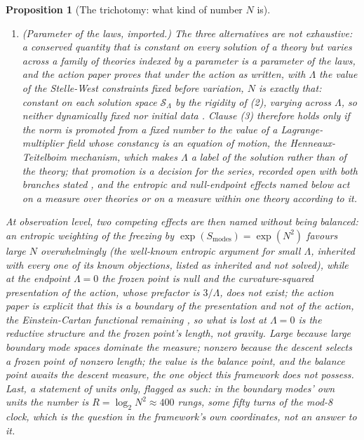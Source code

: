 \documentclass[11pt]{article}
\newtheorem{proposition}[theorem]{Proposition}
\theoremstyle{definition}
\begin{document}
\begin{proposition}[The trichotomy: what kind of number $N$ is]
\begin{enumerate}
\item \emph{(Parameter of the laws, imported.)} The three alternatives are not exhaustive: a conserved quantity that is constant on every solution of a theory but varies across a family of theories indexed by a parameter is a parameter of the laws, and the action paper proves that under the action as written, with $\Lambda$ the value of the Stelle-West constraints fixed before variation, $N$ is exactly that: constant on each solution space $\mathcal{S}_{\Lambda}$ by the rigidity of (2), varying across $\Lambda$, so neither dynamically fixed nor initial data \cite[Prop.~5.8]{ButlerT10}. Clause (3) therefore holds only if the norm is promoted from a fixed number to the value of a Lagrange-multiplier field whose constancy is an equation of motion, the Henneaux-Teitelboim mechanism, which makes $\Lambda$ a label of the solution rather than of the theory; that promotion is a decision for the series, recorded open with both branches stated \cite[Rem.~5.9]{ButlerT10}, and the entropic and null-endpoint effects named below act on a measure over theories or on a measure within one theory according to it.
\end{enumerate}
At observation level, two competing effects are then named without being balanced: an entropic weighting of the freezing by $\exp(S_{\mathrm{modes}}) = \exp(N^{2})$ favours large $N$ overwhelmingly (the well-known entropic argument for small $\Lambda$, inherited with every one of its known objections, listed as inherited and not solved), while at the endpoint $\Lambda = 0$ the frozen point is null and the curvature-squared presentation of the action, whose prefactor is $3/\Lambda$, does not exist; the action paper is explicit that this is a boundary of the presentation and not of the action, the Einstein-Cartan functional remaining \cite[Thm.~3.1, Rem.~3.2]{ButlerT10}, so what is lost at $\Lambda = 0$ is the reductive structure and the frozen point's length, not gravity. Large because large boundary mode spaces dominate the measure; nonzero because the descent selects a frozen point of nonzero length; the value is the balance point, and the balance point awaits the descent measure, the one object this framework does not possess. Last, a statement of units only, flagged as such: in the boundary modes' own units the number is $R = \log_{2} N^{2} \approx 400$ rungs, some fifty turns of the mod-8 clock, which is the question in the framework's own coordinates, not an answer to it.
\end{proposition}
\end{document}
